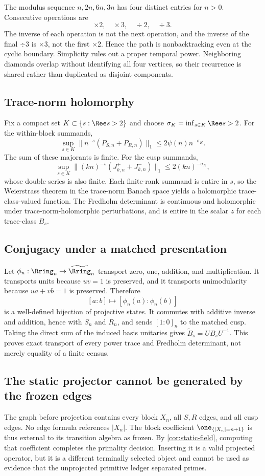 The modulus sequence $n,2n,6n,3n$ has four distinct entries for $n>0$.
Consecutive operations are
\[
 \times2,\quad\times3,\quad\div2,\quad\div3.
\]
The inverse of each operation is not the next operation, and the inverse of
the final $\div3$ is $\times3$, not the first $\times2$.  Hence the path is
nonbacktracking even at the cyclic boundary.  Simplicity rules out a proper
temporal power.  Neighboring diamonds overlap without identifying all four
vertices, so their recurrence is shared rather than duplicated as disjoint
components.

\subsection{Trace-norm holomorphy}

Fix a compact set $K\subset\{s:\Ree s>2\}$ and choose
$\sigma_K=\inf_{s\in K}\Ree s>2$.  For the within-block summands,
\[
 \sup_{s\in K}\|n^{-s}(P_{S,n}+P_{R,n})\|_1
 \le2\psi(n)n^{-\sigma_K}.
\]
The sum of these majorants is finite.  For the cusp summands,
\[
 \sup_{s\in K}\|(kn)^{-s}(J^+_{k,n}+J^-_{k,n})\|_1
 \le2(kn)^{-\sigma_K},
\]
whose double series is also finite.  Each finite-rank summand is entire in
$s$, so the Weierstrass theorem in the trace-norm Banach space yields a
holomorphic trace-class-valued function.  The Fredholm determinant is
continuous and holomorphic under trace-norm-holomorphic perturbations, and is
entire in the scalar $z$ for each trace-class $B_s$.

\subsection{Conjugacy under a matched presentation}

Let $\phi_n:\Rring_n\to\widetilde{\Rring}_n$ transport zero, one, addition,
and multiplication.  It transports units because $uv=1$ is preserved, and
it transports unimodularity because $ua+vb=1$ is preserved.  Therefore
\[
 [a:b]\longmapsto[\phi_n(a):\phi_n(b)]
\]
is a well-defined bijection of projective states.  It commutes with additive
inverse and addition, hence with $S_n$ and $R_n$, and sends $[1:0]_n$ to the
matched cusp.  Taking the direct sum of the induced basis unitaries gives
$\widetilde B_s=U B_sU^{-1}$.  This proves exact transport of every power
trace and Fredholm determinant, not merely equality of a finite census.

\subsection{The static projector cannot be generated by the frozen edges}

The graph before projection contains every block $X_n$, all $S,R$ edges, and
all cusp edges.  No edge formula references $|X_n|$.  The block coefficient
$\one_{\{|X_n|=n+1\}}$ is thus external to its transition algebra as frozen.
By \cref{cor:static-field}, computing that coefficient completes the
primality decision.  Inserting it is a valid projected operator, but it is a
different terminally selected object and cannot be used as evidence that the
unprojected primitive ledger separated primes.
